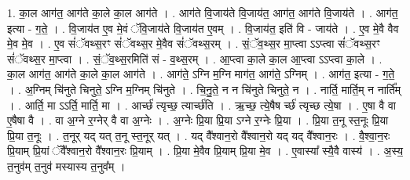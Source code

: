 \documentclass[17pt]{extarticle}
\begin{document}
1. का॒ल आग॑त॒ आग॑ते का॒ले का॒ल आग॑ते । . आग॑ते वि॒जाय॑ते वि॒जाय॑त॒ आग॑त॒ आग॑ते वि॒जाय॑ते । . आग॑त॒ इत्या - ग॒ते॒ । . वि॒जाय॑त ए॒व मे॒वं ॅवि॒जाय॑ते वि॒जाय॑त ए॒वम् । . वि॒जाय॑त॒ इति॑ वि - जाय॑ते । . ए॒व मे॒वै वैव मे॒व मे॒व । . ए॒व सं॑ॅवथ्स॒रꣳ सं॑ॅवथ्स॒र मे॒वैव सं॑ॅवथ्स॒रम् । . सं॒ॅव॒थ्स॒र मा॒प्त्वा ऽऽप्त्वा सं॑ॅवथ्स॒रꣳ सं॑ॅवथ्स॒र मा॒प्त्वा । . सं॒ॅव॒थ्स॒रमिति॑ सं - व॒थ्स॒रम् । . आ॒प्त्वा का॒ले का॒ल आ॒प्त्वा ऽऽप्त्वा का॒ले । . का॒ल आग॑त॒ आग॑ते का॒ले का॒ल आग॑ते । . आग॑ते॒ ऽग्नि म॒ग्नि माग॑त॒ आग॑ते॒ ऽग्निम् । . आग॑त॒ इत्या - ग॒ते॒ । . अ॒ग्निम् चि॑नुते चिनुते॒ ऽग्नि म॒ग्निम् चि॑नुते । . चि॒नु॒ते॒ न न चि॑नुते चिनुते॒ न । . नार्ति॒ मार्ति॒म् न नार्ति᳚म् । . आर्ति॒ मा ऽऽर्ति॒ मार्ति॒ मा । . आर्च्छ॑ त्यृच्छ॒ त्यार्च्छ॑ति । . ऋ॒च्छ॒ त्ये॒षैष र्च्छ॑ त्यृच्छ त्ये॒षा । . ए॒षा वै वा ए॒षैषा वै । . वा अ॒ग्ने र॒ग्नेर् वै वा अ॒ग्नेः । . अ॒ग्नेः प्रि॒या प्रि॒या ऽग्ने र॒ग्नेः प्रि॒या । . प्रि॒या त॒नू स्त॒नूः प्रि॒या प्रि॒या त॒नूः । . त॒नूर् यद् यत् त॒नू स्त॒नूर् यत् । . यद् वै᳚श्वान॒रो वै᳚श्वान॒रो यद् यद् वै᳚श्वान॒रः । . वै॒श्वा॒न॒रः प्रि॒याम् प्रि॒यां ॅवै᳚श्वान॒रो वै᳚श्वान॒रः प्रि॒याम् । . प्रि॒या मे॒वैव प्रि॒याम् प्रि॒या मे॒व । . ए॒वास्या᳚ स्यै॒वै वास्य॑ । . अ॒स्य॒ त॒नुव॑म् त॒नुव॑ मस्यास्य त॒नुव᳚म् । \newline
\end{document}
